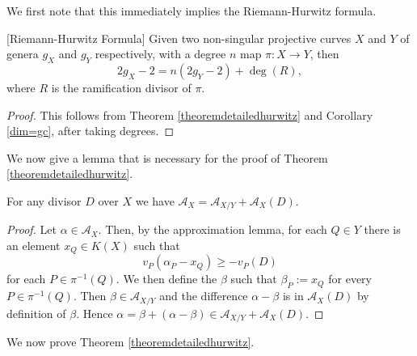 We first note that this immediately implies the Riemann-Hurwitz formula.

    \begin{cor}\label{hur}[Riemann-Hurwitz Formula]
    Given two non-singular projective curves $X$ and $Y$ of genera $g_X$ and $g_Y$ respectively, with a degree $n$ map $\pi\colon X \rightarrow Y$, then
        \[
        2g_X - 2 = n(2g_Y -2) + \deg(R),
        \]
    where $R$ is the ramification divisor of $\pi$.
    \end{cor}
    \begin{proof}
    This follows from Theorem \ref{theoremdetailedhurwitz} and Corollary \ref{dim=gc}, after taking degrees.
    \end{proof}


We now give a lemma that is necessary for the proof of Theorem \ref{theoremdetailedhurwitz}.


    \begin{lem}\label{lemmaadelespace}
    For any divisor $D$ over $X$ we have $\mathcal {A}_X = \mathcal{A}_{X/Y} + \mathcal{A}_X(D)$.
    \end{lem}
    \begin{proof}
    Let $\alpha \in \mathcal{A}_X$. Then, by the approximation lemma, for each $Q\in Y$ there is an element $x_Q\in K(X)$ such that 
        \[
        v_P(\alpha_P - x_Q) \geq -v_P(D)
        \]
    for each $P\in \pi^{-1}(Q)$. 
    We then define the \adele $\beta$ such that $\beta_P := x_Q$ for every $P\in \pi^{-1}(Q)$.
    Then $\beta \in \mathcal{A}_{X/Y}$ and the difference $\alpha - \beta$ is in $\mathcal{A}_X(D)$ by definition of $\beta$.
    Hence $\alpha = \beta + (\alpha - \beta) \in \mathcal{A}_{X/Y} + \mathcal{A}_X(D)$.
    \end{proof}

We now prove Theorem \ref{theoremdetailedhurwitz}.

